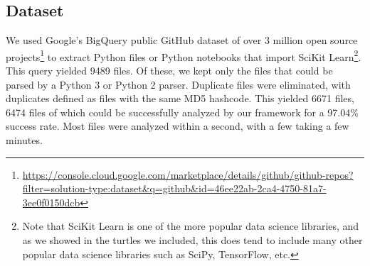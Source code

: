 \subsection{Dataset}

We used Google's BigQuery public GitHub dataset of over 3 million open source projects\footnote{\url{https://console.cloud.google.com/marketplace/details/github/github-repos?filter=solution-type:dataset&q=github&id=46ee22ab-2ca4-4750-81a7-3ee0f0150dcb}} to extract Python files or Python notebooks that import SciKit Learn\footnote{Note that SciKit Learn is one of the more popular data science libraries, and as we showed in the turtles we included, this does tend to include many other popular data science libraries such as SciPy, TensorFlow, etc.}.  This query yielded 9489 files. Of these, we kept only the files that could be parsed by a Python 3 or Python 2 parser.  Duplicate files were eliminated, with duplicates defined as files with the same MD5 hashcode.  This yielded 6671 files, 6474 files of which could be successfully analyzed by our framework for a 97.04\% success rate. Most files were analyzed within a second, with a few taking a few minutes.
